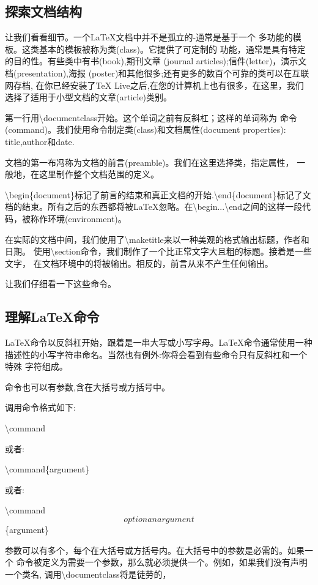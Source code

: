 		\subsection{探索文档结构}
让我们看看细节。一个LaTeX文档中并不是孤立的-通常是基于一个
多功能的模板。这类基本的模板被称为类(class)。它提供了可定制的
功能，通常是具有特定的目的性。有些类中有书(book),期刊文章
(journal articles);信件(letter)，演示文档(presentation),海报
(poster)和其他很多;还有更多的数百个可靠的类可以在互联网存档,
在你已经安装了TeX Live之后,在您的计算机上也有很多，在这里，我们
选择了适用于小型文档的文章(article)类别。

第一行用\textbackslash documentclass开始。这个单词之前有反斜杠；这样的单词称为
命令(command)。我们使用命令制定类(class)和文档属性(document properties):
title,author和date.

文档的第一布冯称为文档的前言(preamble)。我们在这里选择类，指定属性，
一般地，在这里制作整个文档范围的定义。

\textbackslash begin\{document\}标记了前言的结束和真正文档的开始.\textbackslash end\{document\}标记了文档的结束。所有之后的东西都将被LaTeX忽略。在\textbackslash begin...\textbackslash end之间的这样一段代码，被称作环境(environment)。

在实际的文档中间，我们使用了\textbackslash maketitle来以一种美观的格式输出标题，作者和日期。
使用\textbackslash section命令，我们制作了一个比正常文字大且粗的标题。接着是一些文字，
在文档环境中的将被输出。相反的，前言从来不产生任何输出。

让我们仔细看一下这些命令。

		\subsection{理解LaTeX命令}
LaTeX命令以反斜杠开始，跟着是一串大写或小写字母。LaTeX命令通常使用一种
描述性的小写字符串命名。当然也有例外:你将会看到有些命令只有反斜杠和一个特殊
字符组成。

命令也可以有参数,含在大括号或方括号中。

调用命令格式如下:

\textbackslash command

或者:

\textbackslash command\{argument\}

或者:

\textbackslash command\[optionan argument\]\{argument\}

参数可以有多个，每个在大括号或方括号内。在大括号中的参数是必需的。如果一个
命令被定义为需要一个参数，那么就必须提供一个。例如，如果我们没有声明一个类名,
调用\textbackslash documentclass将是徒劳的，


